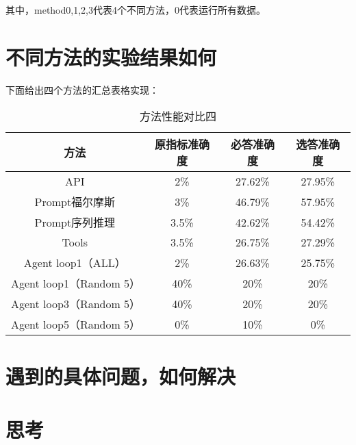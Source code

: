 \documentclass[answers]{exam}  %
\begin{document}
其中，method0,1,2,3代表4个不同方法，0代表运行所有数据。

\section{不同方法的实验结果如何}

下面给出四个方法的汇总表格实现：
\begin{table}[h]
    \centering
    \begin{tabular}{cccc}
    \toprule
    \textbf{方法} & \textbf{原指标准确度} & \textbf{必答准确度} &\textbf{选答准确度}\\
    \midrule
    API & 2\% & 27.62\% & 27.95\% \\
    \hline
    Prompt福尔摩斯 & 3\% & 46.79\% & 57.95\% \\
    \hline
    Prompt序列推理 & 3.5\% & 42.62\% & 54.42\% \\
    \hline
    Tools & 3.5\% & 26.75\% & 27.29\% \\
    \hline
    Agent loop1（ALL） & 2\% & 26.63\% & 25.75\% \\
    \hline
    \hline
    Agent loop1（Random 5） & 40\% & 20\% & 20\% \\
    \hline
    Agent loop3（Random 5） & 40\% & 20\% & 20\% \\
    \hline
    Agent loop5（Random 5） & 0\% & 10\% & 0\% \\
    \bottomrule
    \end{tabular}
    \caption{方法性能对比四}
\end{table}


\section{遇到的具体问题，如何解决}

\section{思考}
\end{document}
